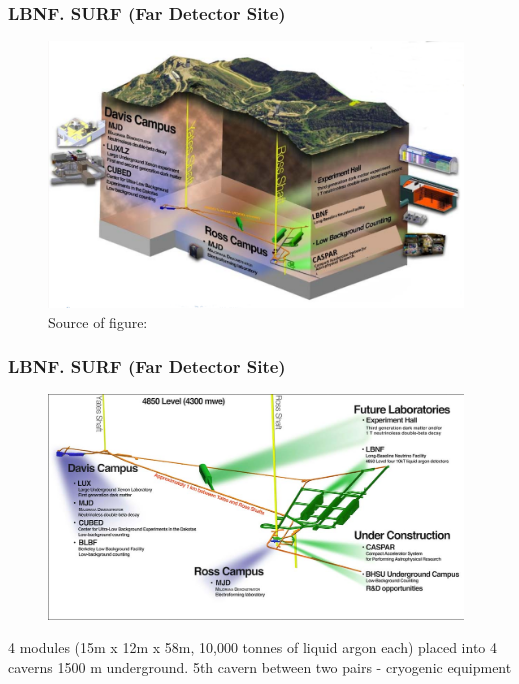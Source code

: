 \begin{frame}\frametitle{LBNF. SURF (Far Detector Site)}
\begin{figure}
\label{fig:farDetector_SURF1}
\centering
\includegraphics[width=0.98\textwidth, keepaspectratio=true]{figs/farDetector_SanfordUndergroundResearchFacility.png}
\tiny Source of figure: \cite{ref_LBNF_collaborationMeeting}
\end{figure}

\end{frame}

\begin{frame}\frametitle{LBNF. SURF (Far Detector Site)}
\begin{figure}
\label{fig:farDetector_SURF2}
\centering
\includegraphics[width=0.98\textwidth, keepaspectratio=true]{figs/farDetector_wholeLab.png}
\end{figure}
\scriptsize
4 modules (15m x 12m x 58m, 10,000 tonnes of liquid argon each) placed into 4 caverns 1500 m underground. 5th cavern between two pairs - cryogenic equipment  \cite{ref_LBNFweb} \\
\end{frame}

